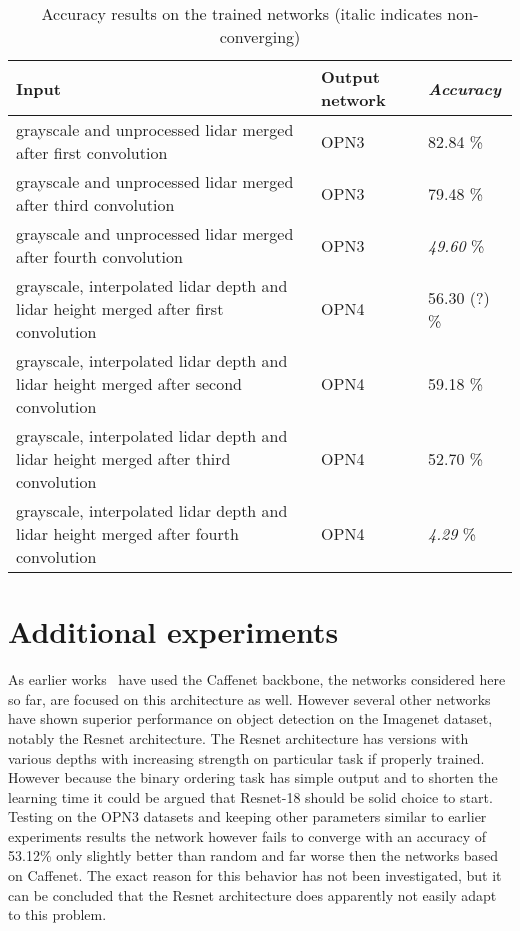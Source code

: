 \begin{table}[]
\centering
\caption{Accuracy results on the trained networks (italic indicates non-converging)}
\label{tab:merge_results}
\begin{tabular}{|p{7.5cm}|p{2cm}|p{2cm}|}
\hline
\textbf{Input}                                                          & \textbf{Output network} & \textit{\textbf{Accuracy}} \\ \hline
grayscale and unprocessed lidar merged after first convolution          & OPN3                    & 82.84 \%                   \\ \hline
grayscale and unprocessed lidar merged after third convolution          & OPN3                    & 79.48 \%                   \\ \hline
grayscale and unprocessed lidar merged after fourth convolution         & OPN3                    & \textit{49.60} \%          \\ \hline
grayscale, interpolated lidar depth and lidar height merged after first convolution          & OPN4                    & 56.30 (?) \%                   \\ \hline
grayscale, interpolated lidar depth and lidar height merged after second convolution         & OPN4                    & 59.18 \%                   \\ \hline
grayscale, interpolated lidar depth and lidar height merged after third convolution          & OPN4                    & 52.70 \%                   \\ \hline
grayscale, interpolated lidar depth and lidar height merged after fourth convolution         & OPN4                    & \textit{4.29} \%                   \\ \hline
\end{tabular}
\end{table}

\section{Additional experiments}
As earlier works~\cite{misra2016,lee2017} have used the Caffenet backbone, the networks considered here so far, are focused on this architecture as well. However several other networks have shown superior performance on object detection on the Imagenet dataset, notably the Resnet architecture\cite{he2016}. The Resnet architecture has versions with various depths with increasing strength on particular task if properly trained. However because the binary ordering task has simple output and to shorten the learning time it could be argued that Resnet-18 should be solid choice to start. Testing on the OPN3 datasets and keeping other parameters similar to earlier experiments results the network however fails to converge with an accuracy of 53.12\% only slightly better than random and far worse then the networks based on Caffenet. The exact reason for this behavior has not been investigated, but it can be concluded that the Resnet architecture does apparently not easily adapt to this problem.

